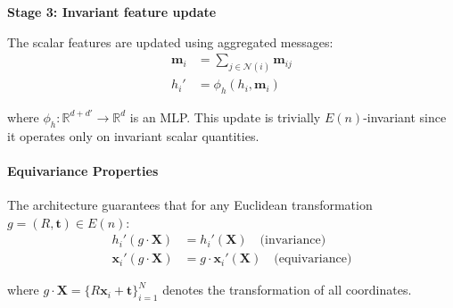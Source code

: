 \textbf{Stage 3: Invariant feature update}

The scalar features are updated using aggregated messages:
\begin{align}
\mathbf{m}_i &= \sum_{j \in \mathcal{N}(i)} \mathbf{m}_{ij} \label{eq:egnn_aggregate}\\
h_i' &= \phi_h(h_i, \mathbf{m}_i) \label{eq:egnn_feature_update}
\end{align}

where $\phi_h: \mathbb{R}^{d + d'} \to \mathbb{R}^d$ is an MLP. This update is trivially $E(n)$-invariant since it operates only on invariant scalar quantities.

\paragraph{Equivariance Properties}

The architecture guarantees that for any Euclidean transformation $g = (R, \mathbf{t}) \in E(n)$:
\begin{align}
h_i'(g \cdot \mathbf{X}) &= h_i'(\mathbf{X}) \quad \text{(invariance)} \\
\mathbf{x}_i'(g \cdot \mathbf{X}) &= g \cdot \mathbf{x}_i'(\mathbf{X}) \quad \text{(equivariance)}
\end{align}

where $g \cdot \mathbf{X} = \{R\mathbf{x}_i + \mathbf{t}\}_{i=1}^N$ denotes the transformation of all coordinates.

